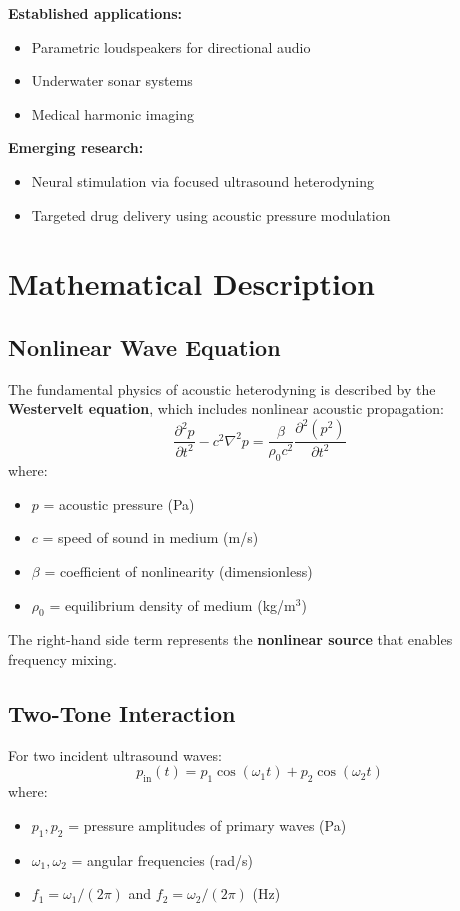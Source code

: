 \textbf{Established applications:}
\begin{itemize}
\item Parametric loudspeakers for directional audio
\item Underwater sonar systems
\item Medical harmonic imaging
\end{itemize}

\textbf{Emerging research:}
\begin{itemize}
\item Neural stimulation via focused ultrasound heterodyning
\item Targeted drug delivery using acoustic pressure modulation
\end{itemize}

\section{Mathematical Description}

\subsection{Nonlinear Wave Equation}

The fundamental physics of acoustic heterodyning is described by the \textbf{Westervelt equation}, which includes nonlinear acoustic propagation:
\begin{equation}
\frac{\partial^2 p}{\partial t^2} - c^2 \nabla^2 p = \frac{\beta}{\rho_0 c^2} \frac{\partial^2 (p^2)}{\partial t^2}
\end{equation}
where:
\begin{itemize}
\item $p$ = acoustic pressure (Pa)
\item $c$ = speed of sound in medium (m/s)
\item $\beta$ = coefficient of nonlinearity (dimensionless)
\item $\rho_0$ = equilibrium density of medium (kg/m$^3$)
\end{itemize}

The right-hand side term represents the \textbf{nonlinear source} that enables frequency mixing.

\subsection{Two-Tone Interaction}

For two incident ultrasound waves:
\begin{equation}
p_{\text{in}}(t) = p_1 \cos(\omega_1 t) + p_2 \cos(\omega_2 t)
\end{equation}
where:
\begin{itemize}
\item $p_1, p_2$ = pressure amplitudes of primary waves (Pa)
\item $\omega_1, \omega_2$ = angular frequencies (rad/s)
\item $f_1 = \omega_1/(2\pi)$ and $f_2 = \omega_2/(2\pi)$ (Hz)
\end{itemize}

